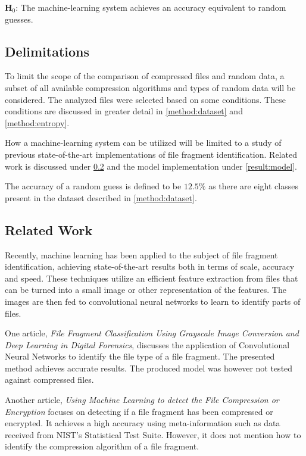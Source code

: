 \documentclass[conference]{IEEEtran}
\begin{document}
\textbf{H$_0$}: The machine-learning system achieves an accuracy equivalent to random guesses.

\subsection{Delimitations}

To limit the scope of the comparison of compressed files and random data, a subset of all available compression algorithms and types of random data will be considered. The analyzed files were selected based on some conditions. These conditions are discussed in greater detail in \ref{method:dataset} and \ref{method:entropy}.

How a machine-learning system can be utilized will be limited to a study of previous state-of-the-art implementations of file fragment identification. Related work is discussed under \ref{introduction:related} and the model implementation under \ref{result:model}.

The accuracy of a random guess is defined to be $12.5\%$ as there are eight classes present in the dataset described in \ref{method:dataset}.

\subsection{Related Work}
\label{introduction:related}
Recently, machine learning has been applied to the subject of file fragment identification, achieving state-of-the-art results both in terms of scale, accuracy and speed. These techniques utilize an efficient feature extraction from files that can be turned into a small image or other representation of the features. The images are then fed to convolutional neural networks to learn to identify parts of files.

One article, \textit{File Fragment Classification Using Grayscale Image Conversion and Deep Learning in Digital Forensics}, discusses the application of Convolutional Neural Networks to identify the file type of a file fragment. The presented method achieves accurate results. The produced model was however not tested against compressed files\cite{chen2018}.

Another article, \textit{Using Machine Learning to detect the File Compression or Encryption} focuses on detecting if a file fragment has been compressed or encrypted. It achieves a high accuracy using meta-information such as data received from NIST's Statistical Test Suite. However, it does not mention how to identify the compression algorithm of a file fragment\cite{hahn2018}.
\end{document}
